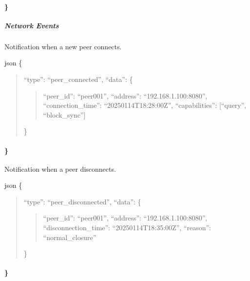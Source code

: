 \documentclass[letterpaper,10pt,english]{sphinxmanual}
\begin{document}
\paragraph{\}}
\label{\detokenize{api/websocket-api:id20}}

\subparagraph{Network Events}
\label{\detokenize{api/websocket-api:network-events}}
\sphinxAtStartPar
{}
Notification when a new peer connects.

\sphinxAtStartPar
{\color{red}\bfseries{}\textasciigrave{}\textasciigrave{}}{\color{red}\bfseries{}\textasciigrave{}}json
\{
\begin{quote}

\sphinxAtStartPar
“type”: “peer\_connected”,
“data”: \{
\begin{quote}

\sphinxAtStartPar
“peer\_id”: “peer\sphinxhyphen{}001”,
“address”: “192.168.1.100:8080”,
“connection\_time”: “2025\sphinxhyphen{}01\sphinxhyphen{}14T18:28:00Z”,
“capabilities”: {[}“query”, “block\_sync”{]}
\end{quote}

\sphinxAtStartPar
\}
\end{quote}


\paragraph{\}}
\label{\detokenize{api/websocket-api:id25}}
\sphinxAtStartPar
{}
Notification when a peer disconnects.

\sphinxAtStartPar
{\color{red}\bfseries{}\textasciigrave{}\textasciigrave{}}{\color{red}\bfseries{}\textasciigrave{}}json
\{
\begin{quote}

\sphinxAtStartPar
“type”: “peer\_disconnected”,
“data”: \{
\begin{quote}

\sphinxAtStartPar
“peer\_id”: “peer\sphinxhyphen{}001”,
“address”: “192.168.1.100:8080”,
“disconnection\_time”: “2025\sphinxhyphen{}01\sphinxhyphen{}14T18:35:00Z”,
“reason”: “normal\_closure”
\end{quote}

\sphinxAtStartPar
\}
\end{quote}


\paragraph{\}}
\label{\detokenize{api/websocket-api:id30}}
\end{document}
